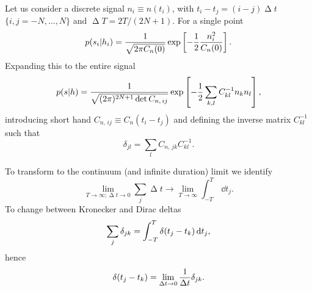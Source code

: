 Let us consider a discrete signal $n_i \equiv n(t_i)$, with $t_i - t_j = (i - j)\upDelta t$ $\{i,j = -N, \ldots, N\}$ and $\upDelta T = 2T/(2N + 1)$. For a single point
\begin{equation}
p(s_i|h_i) = \frac{1}{\sqrt{2\pi C_n(0)}} \exp\left[-\frac{1}{2} \frac{n_i^2}{C_n(0)}\right].
\end{equation}
Expanding this to the entire signal
\begin{equation}
p(s|h) = \frac{1}{\sqrt{(2\pi)^{2N+1} \det C_{n,\,ij}}} \exp\left[-\frac{1}{2} \sum_{k,l}C^{-1}_{kl}n_k n_l\right],
\label{eq:prod_prob}
\end{equation}
introducing short hand $C_{n,\,ij} \equiv C_n(t_i - t_j)$ and defining the inverse matrix $C^{-1}_{kl}$ such that
\begin{equation}
\delta_{jl} = \sum_l C_{n,\,jk}C^{-1}_{kl}.
\end{equation}

To transform to the continuum (and infinite duration) limit we identify
\begin{equation}
\lim_{T \rightarrow \infty; \upDelta t \rightarrow 0} \sum_j \upDelta t \rightarrow \lim_{T \rightarrow \infty} \int_{-T}^{T}\,\dd t_j.
\end{equation}
To change between Kronecker and Dirac deltas
\begin{equation}
\sum_j \delta_{jk} = \int_{-T}^{T}{\delta(t_j - t_k)}\,\mathrm{d}{t_j},
\end{equation}
hence
\begin{equation}
\delta(t_j - t_k) = \lim_{\upDelta t \rightarrow 0} \recip{\upDelta t} \delta_{jk}.
\end{equation}


